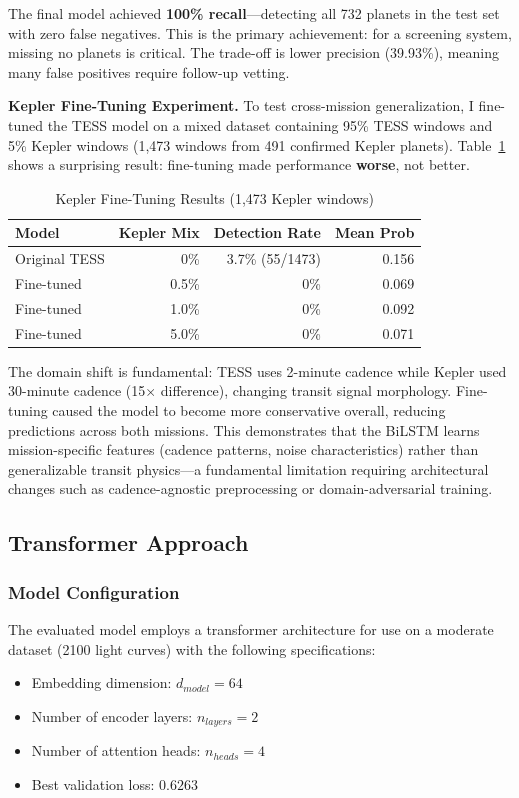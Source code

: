 \documentclass[letterpaper]{article} %
\begin{document}
The final model achieved \textbf{100\% recall}---detecting all 732 planets in the test set with zero false negatives. This is the primary achievement: for a screening system, missing no planets is critical. The trade-off is lower precision (39.93\%), meaning many false positives require follow-up vetting.

\textbf{Kepler Fine-Tuning Experiment.} To test cross-mission generalization, I fine-tuned the TESS model on a mixed dataset containing 95\% TESS windows and 5\% Kepler windows (1,473 windows from 491 confirmed Kepler planets). Table~\ref{tab:finetuning_results} shows a surprising result: fine-tuning made performance \textbf{worse}, not better.

\begin{table}[h]
\centering
\caption{Kepler Fine-Tuning Results (1,473 Kepler windows)}
\label{tab:finetuning_results}
\begin{tabular}{@{}lrrr@{}}
\toprule
\textbf{Model} & \textbf{Kepler Mix} & \textbf{Detection Rate} & \textbf{Mean Prob} \\
\midrule
Original TESS & 0\% & 3.7\% (55/1473) & 0.156 \\
Fine-tuned & 0.5\% & 0\% & 0.069 \\
Fine-tuned & 1.0\% & 0\% & 0.092 \\
Fine-tuned & 5.0\% & 0\% & 0.071 \\
\bottomrule
\end{tabular}
\end{table}

The domain shift is fundamental: TESS uses 2-minute cadence while Kepler used 30-minute cadence (15$\times$ difference), changing transit signal morphology. Fine-tuning caused the model to become more conservative overall, reducing predictions across both missions. This demonstrates that the BiLSTM learns mission-specific features (cadence patterns, noise characteristics) rather than generalizable transit physics---a fundamental limitation requiring architectural changes such as cadence-agnostic preprocessing or domain-adversarial training.

\subsection{Transformer Approach}
\subsubsection*{Model Configuration}
The evaluated model employs a  transformer architecture for use on a moderate dataset (2100 light curves) with the following specifications:
\begin{itemize}
    \item Embedding dimension: \(d_{model} = 64\)
    \item Number of encoder layers: \(n_{layers} = 2\)
    \item Number of attention heads: \(n_{heads} = 4\)
    \item Best validation loss: \(0.6263\)
\end{itemize}
\end{document}
